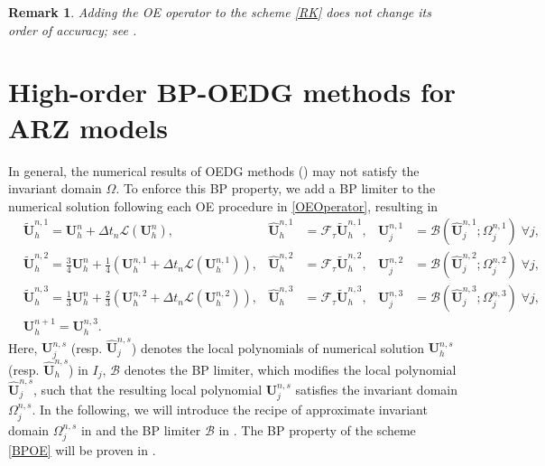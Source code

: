 \documentclass[times,final]{elsarticle}
\newtheorem{remark}{Remark}[section]
\numberwithin{equation}{section}
\theoremstyle{definition}
\theoremstyle{remark}
\newcommand{\BU}{\mathbf{U}}
\newcommand{\hBU}{\widehat{\BU}}
\newcommand{\tBU}{\widetilde{\BU}}
\begin{document}
\begin{remark}
	Adding the OE operator to the scheme \eqref{RK} does not change its order of accuracy; see \cite{peng2023oedg}. 
\end{remark}

\section{High-order BP-OEDG methods for ARZ models}\label{sec:BP-OEDG}

In general, the numerical results of OEDG methods () may not satisfy the invariant domain $\Omega$. 
To enforce this BP property, we add a BP limiter to the numerical solution following each OE procedure in \eqref{OEOperator}, resulting in
\begin{equation}\label{BPOE}
	\begin{aligned}
		&\tBU_h^{n, 1}  = \BU^{n}_h + \Delta t_n \mathcal{L} \left(\BU^{n}_h \right), 
		& 
		 \hBU_h^{n, 1} & = \mathcal{F}_\tau \tBU_h^{n, 1}, 
		&
		 \BU_j^{n, 1} & = \mathcal{B} \left( \hBU_j^{n, 1}; {\Omega}_j^{n,1} \right) \; \forall j,
		\\
		& \tBU_h^{n, 2} = \frac{3}{4} \BU_h^{n} + \frac{1}{4} \left( \BU_h^{n, 1} + \Delta t_n \mathcal{L} (\BU_h^{n, 1} ) \right), 
		& 
		\hBU_h^{n, 2} & = \mathcal{F}_\tau \tBU_h^{n, 2}, 
		&
		\BU_j^{n, 2} & = \mathcal{B} \left( \hBU_j^{n, 2}; {\Omega}_j^{n,2} \right) \; \forall j,
		\\
		&\tBU_h^{n,3} = \frac{1}{3} \BU_h^{n} + \frac{2}{3} \left( \BU_h^{n, 2} + \Delta t_n \mathcal{L} (\BU_h^{n, 2} ) \right), 
		& 
		\hBU_h^{n,3} & = \mathcal{F}_\tau \tBU_h^{n,3},
		&
		\BU_j^{n,3} & = \mathcal{B} \left( \hBU_j^{n,3}; {\Omega}_j^{n,3} \right) \; \forall j,
		\\
		&\BU^{n+1}_h = \BU^{n,3}_h.
	\end{aligned}
\end{equation}
Here, $\BU^{n,s}_j$ (resp. $\hBU^{n,s}_j$) denotes the local polynomials of numerical solution $\BU^{n,s}_h$ (resp. $\hBU^{n,s}_h$) in $I_j$, $\mathcal{B}$ denotes the BP limiter, which modifies the local polynomial $\hBU_j^{n,s}$, such that the resulting local polynomial ${\BU}_j^{n,s}$ satisfies the invariant domain ${\Omega}_j^{n,s}$.
In the following, we will introduce the recipe of approximate invariant domain ${\Omega}_j^{n,s}$ in  and the BP limiter $\mathcal{B}$ in .
The BP property of the scheme \eqref{BPOE} will be proven in .
\end{document}
